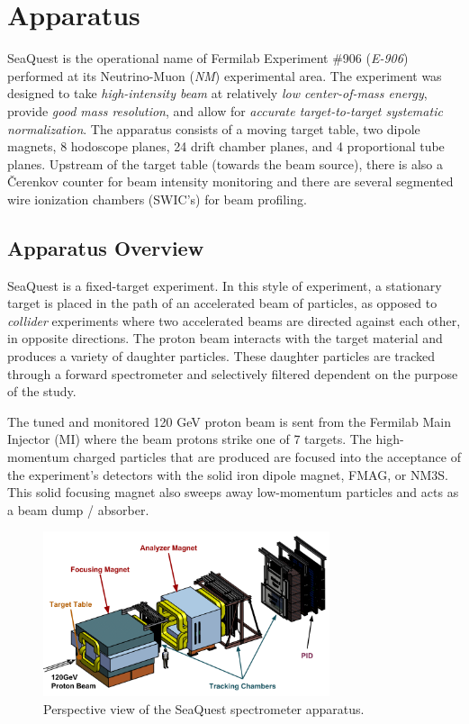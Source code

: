 \chapter{Apparatus}


SeaQuest is the operational name of Fermilab Experiment \#906 (\emph{E-906}) performed at its Neutrino-Muon (\emph{NM}) experimental area. The experiment was designed to take \emph{high-intensity beam} at relatively \emph{low center-of-mass energy}, provide \emph{good mass resolution}, and allow for \emph{accurate target-to-target systematic normalization}. The apparatus consists of a moving target table, two dipole magnets, 8 hodoscope planes, 24 drift chamber planes, and 4 proportional tube planes. Upstream of the target table (towards the beam source), there is also a \v{C}erenkov counter for beam intensity monitoring and there are several segmented wire ionization chambers (SWIC's) for beam profiling.

\section{Apparatus Overview}

SeaQuest is a fixed-target experiment. In this style of experiment, a stationary target is placed in the path of an accelerated beam of particles, as opposed to \emph{collider} experiments where two accelerated beams are directed against each other, in opposite directions. The proton beam interacts with the target material and produces a variety of daughter particles. These daughter particles are tracked through a forward spectrometer and selectively filtered dependent on the purpose of the study.

The tuned and monitored 120 GeV proton beam is sent from the Fermilab Main Injector (MI) where the beam protons strike one of 7 targets. The high-momentum charged particles that are produced are focused into the acceptance of the experiment's detectors with the solid iron dipole magnet, FMAG, or NM3S. This solid focusing magnet also sweeps away low-momentum particles and acts as a beam dump / absorber.

\begin{figure}
	\begin{center}
		\includegraphics[width=0.75\textwidth]{figures/apparatus/Spectrometer.png}
		\caption{Perspective view of the SeaQuest spectrometer apparatus.}
		\label{fig:spectrometer-perspective}
	\end{center}
\end{figure}

